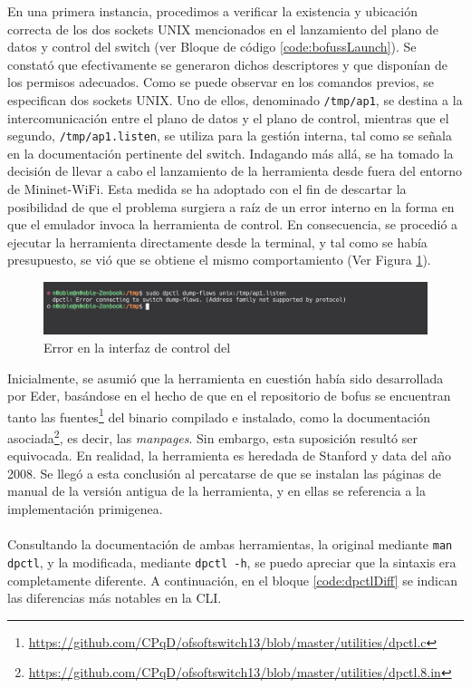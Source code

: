 En una primera instancia, procedimos a verificar la existencia y ubicación correcta de los dos sockets UNIX mencionados en el lanzamiento del plano de datos y control del switch (ver Bloque de código \ref{code:bofussLaunch}). Se constató que efectivamente se generaron dichos descriptores y que disponían de los permisos adecuados. Como se puede observar en los comandos previos, se especifican dos sockets UNIX. Uno de ellos, denominado \texttt{/tmp/ap1}, se destina a la intercomunicación entre el plano de datos y el plano de control, mientras que el segundo, \texttt{/tmp/ap1.listen}, se utiliza para la gestión interna, tal como se señala en la documentación pertinente del switch. Indagando más allá, se ha tomado la decisión de llevar a cabo el lanzamiento de la herramienta desde fuera del entorno de Mininet-WiFi. Esta medida se ha adoptado con el fin de descartar la posibilidad de que el problema surgiera a raíz de un error interno en la forma en que el emulador invoca la herramienta de control. En consecuencia, se procedió a ejecutar la herramienta directamente desde la terminal, y tal como se había presupuesto, se vió que se obtiene el mismo comportamiento (Ver Figura \ref{fig:dpctl_2}).\\

\begin{figure}[ht]
    \centering
    \includegraphics[width=\textwidth]{archivos/img/dev/dpctl_2.png}
    \caption{Error en la interfaz de control del }
    \label{fig:dpctl_2}
\end{figure}


Inicialmente, se asumió que la herramienta en cuestión había sido desarrollada por Eder, basándose en el hecho de que en el repositorio de \gls{bofus} se encuentran tanto las fuentes\footnote{\url{https://github.com/CPqD/ofsoftswitch13/blob/master/utilities/dpctl.c}} del binario compilado e instalado, como la documentación asociada\footnote{\url{https://github.com/CPqD/ofsoftswitch13/blob/master/utilities/dpctl.8.in}}, es decir, las \textit{manpages}. Sin embargo, esta suposición resultó ser equivocada. En realidad, la herramienta es heredada de Stanford y data del año 2008. Se llegó a esta conclusión al percatarse de que se instalan las páginas de manual de la versión antigua de la herramienta, y en ellas se referencia a la implementación primigenea.\\
\\
Consultando la documentación de ambas herramientas, la original mediante \texttt{man dpctl}, y la modificada, mediante \texttt{dpctl -h}, se puedo apreciar que la sintaxis era completamente diferente. A continuación, en el bloque \ref{code:dpctlDiff} se indican las diferencias más notables en la CLI.

